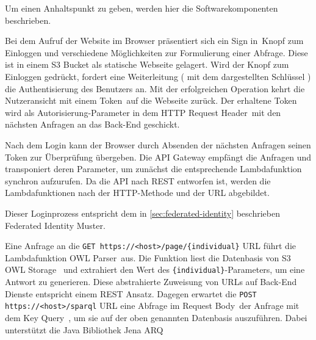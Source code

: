 \documentclass[
12pt,
english,
ngerman,
headsepline,
twoside,
openright,
numbers=noenddot,version=first
]{scrreprt}
\begin{document}
Um einen Anhaltspunkt zu geben, werden hier die Softwarekomponenten beschrieben.

Bei dem Aufruf der Website im Browser präsentiert sich ein \glqq Sign in\grqq\ Knopf zum Einloggen und verschiedene Möglichkeiten zur Formulierung einer Abfrage. Diese ist in einem \acrshort{S3} Bucket als statische Webseite gelagert.
Wird der Knopf zum Einloggen gedrückt, fordert eine Weiterleitung ( mit dem dargestellten Schlüssel ) die Authentisierung des Benutzers an. Mit der erfolgreichen Operation kehrt die Nutzeransicht mit einem \glqq Token\grqq\ auf die Webseite zurück. Der erhaltene Token wird als Autorisierung-Parameter in dem \glqq HTTP Request Header\grqq\ mit den nächsten Anfragen an das Back-End geschickt.

Nach dem Login kann der Browser durch Absenden der nächsten Anfragen seinen Token zur Überprüfung übergeben. Die \acrshort{API} Gateway empfängt die Anfragen und transponiert deren Parameter, um zunächst die entsprechende Lambdafunktion synchron aufzurufen. Da die \acrshort{API} nach \acrshort{REST} entworfen ist, werden die Lambdafunktionen nach der \acrshort{HTTP}-Methode und der \acrshort{URL} abgebildet.

Dieser Loginprozess entspricht dem in  \autoref{sec:federated-identity} beschrieben Federated Identity Muster.

Eine Anfrage an die \lstinline|GET https://<host>/page/{individual}| \acrshort{URL} führt die Lambdafunktion \glqq OWL Parser\grqq\ aus. Die Funktion liest die Datenbasis von S3 \glqq OWL Storage \grqq\ und extrahiert den Wert des \lstinline|{individual}|-Parameters, um eine Antwort zu generieren. Diese abstrahierte Zuweisung von \acrshort{URL}s auf Back-End Dienste entspricht einem \acrshort{REST} Ansatz. Dagegen erwartet die \lstinline|POST https://<host>/sparql| \acrshort{URL} eine Abfrage im \glqq Request Body\grqq\ der Anfrage mit dem Key \glqq Query\grqq\ , um sie auf der oben genannten Datenbasis auszuführen. Dabei unterstützt die Java Bibliothek Jena ARQ\cite{jenaARQ}
\end{document}
